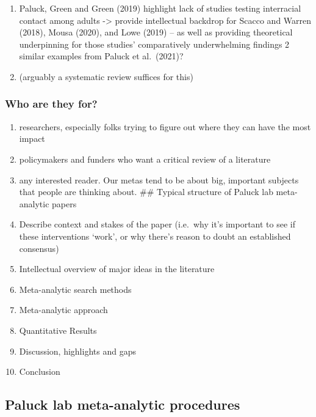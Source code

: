 \documentclass[
  man]{apa6}
\providecommand{\tightlist}{%
  \setlength{\itemsep}{0pt}\setlength{\parskip}{0pt}}
\begin{document}
\begin{enumerate}
\begin{enumerate}
    \begin{enumerate}
    \def\labelenumiii{\arabic{enumiii}.}
    \tightlist
    \item
      Paluck, Green and Green (2019) highlight lack of studies testing interracial contact among adults -\textgreater{} provide intellectual backdrop for Scacco and Warren (2018), Mousa (2020), and Lowe (2019) -- as well as providing theoretical underpinning for those studies' comparatively underwhelming findings
      2 similar examples from Paluck et al.~(2021)?
    \item
      (arguably a systematic review suffices for this)
    \end{enumerate}
  \end{enumerate}
\end{enumerate}

\subsubsection{Who are they for?}\label{who-are-they-for}

\begin{enumerate}
\def\labelenumi{\arabic{enumi}.}
\item
  researchers, especially folks trying to figure out where they can have the most impact
\item
  policymakers and funders who want a critical review of a literature
\item
  any interested reader. Our metas tend to be about big, important subjects that people are thinking about.
  \#\# Typical structure of Paluck lab meta-analytic papers
\item
  Describe context and stakes of the paper (i.e.~why it's important to see if these interventions `work', or why there's reason to doubt an established consensus)
\item
  Intellectual overview of major ideas in the literature
\item
  Meta-analytic search methods
\item
  Meta-analytic approach
\item
  Quantitative Results
\item
  Discussion, highlights and gaps
\item
  Conclusion
\end{enumerate}

\subsection{Paluck lab meta-analytic procedures}\label{paluck-lab-meta-analytic-procedures}
\end{document}
